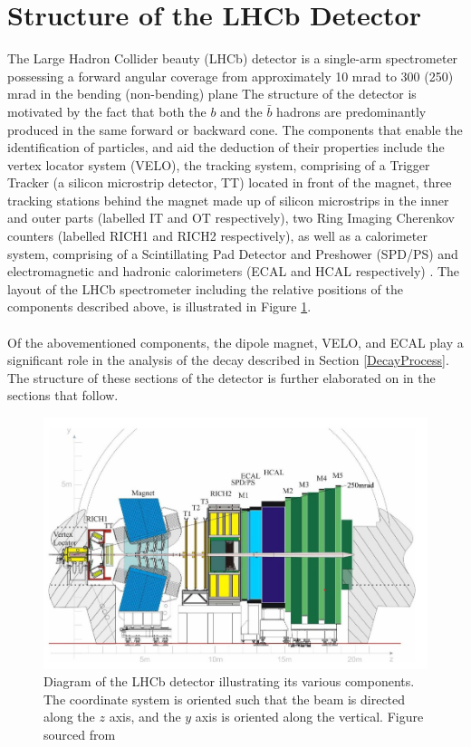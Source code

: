 \section{Structure of the LHCb Detector}
The Large Hadron Collider beauty (LHCb) detector is a single-arm spectrometer possessing a forward angular coverage from
approximately 10 mrad to 300 (250) mrad in the bending (non-bending) plane \cite{https://doi.org/10.48550/arxiv.0910.1740}
The structure of the detector is motivated by the fact that both the $b$ and the $\bar{b}$ hadrons are predominantly produced in the
same forward or backward cone. The components that enable the identification of particles, and aid the deduction of their properties include
the vertex locator system (VELO), the tracking system, comprising of a Trigger Tracker (a silicon microstrip detector, TT) located in front 
of the magnet, three tracking stations behind the magnet made up of silicon microstrips in the inner and outer parts (labelled IT and OT respectively),
two Ring Imaging Cherenkov counters (labelled RICH1 and RICH2 respectively), as well as a calorimeter system, comprising of a Scintillating Pad Detector and Preshower
(SPD/PS) and electromagnetic and hadronic calorimeters (ECAL and HCAL respectively) \cite{https://doi.org/10.48550/arxiv.0910.1740}. The layout of the LHCb spectrometer including the relative positions of the components described above, is illustrated in Figure \ref{LHCbDetector}.\\
\\
Of the abovementioned components, the dipole magnet, VELO, and ECAL play a significant role
in the analysis of the decay described in Section \ref{DecayProcess}. The structure of these sections of the
detector is further elaborated on in the sections that follow.
\begin{figure}[H]
    \centering
    \includegraphics[scale = 0.45]{LHCbDetector.jpg}
    \caption{Diagram of the LHCb detector illustrating its various components. The coordinate system is oriented such that the beam is directed along the $z$ axis, and the $y$ axis is oriented along the vertical. Figure sourced from \cite{AbellanBeteta:2020amj}}
    \label{LHCbDetector}
\end{figure}
